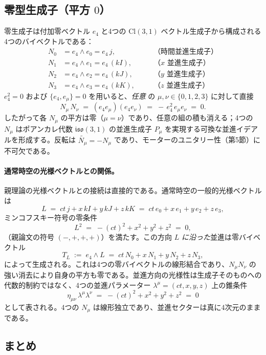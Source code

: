 \documentclass[11pt,a4paper]{article}
\begin{document}
\subsection{零型生成子（平方 $0$）}

零生成子は付加零ベクトル $e_{4}$ と4つの $\mathrm{Cl}(3,1)$ ベクトル生成子から構成される4つのバイベクトルである：
\begin{align*}
N_{0} &= e_{4}\wedge e_{0} = e_{4}\,j,         &\quad& \text{（時間並進生成子）}\\
N_{1} &= e_{4}\wedge e_{1} = e_{4}\,(kI),      &\quad& \text{（$x$ 並進生成子）}\\
N_{2} &= e_{4}\wedge e_{2} = e_{4}\,(kJ),      &\quad& \text{（$y$ 並進生成子）}\\
N_{3} &= e_{4}\wedge e_{3} = e_{4}\,(kK),      &\quad& \text{（$z$ 並進生成子）}
\end{align*}
$e_{4}^{2}=0$ および $\{e_{4},e_{\mu}\}=0$ を用いると、\emph{任意} の $\mu,\nu\in\{0,1,2,3\}$ に対して直接
\[
N_{\mu}\,N_{\nu} \;=\; (e_{4}e_{\mu})(e_{4}e_{\nu}) \;=\; -\,e_{4}^{2}\,e_{\mu}e_{\nu} \;=\; 0.
\]
したがって各 $N_{\mu}$ の平方は零（$\mu=\nu$）であり、任意の組の積も消える；4つの $N_{\mu}$ はポアンカレ代数 $\mathfrak{iso}(3,1)$ の並進生成子 $P_{\mu}$ を実現する可換な並進イデアルを形成する。反転は $\widetilde{N_{\mu}}=-N_{\mu}$ であり、モーターのユニタリー性（第5節）に不可欠である。

\paragraph{通常時空の光様ベクトルとの関係。}
親理論の光様ベクトルとの接続は直接的である。通常時空の一般的光様ベクトルは
\[
L \;=\; ct\,j + x\,kI + y\,kJ + z\,kK \;=\; ct\,e_{0} + x\,e_{1} + y\,e_{2} + z\,e_{3},
\]
ミンコフスキー符号の零条件
\[
L^{2} \;=\; -(ct)^{2} + x^{2} + y^{2} + z^{2} \;=\; 0,
\]
（親論文の符号 $(-,+,+,+)$）を満たす。この方向 $L$ \emph{に沿った}並進は零バイベクトル
\[
T_{L} \;:=\; e_{4}\wedge L \;=\; ct\,N_{0} + x\,N_{1} + y\,N_{2} + z\,N_{3},
\]
によって生成される。これは4つの零バイベクトルの線形結合であり、$N_{\mu}N_{\nu}$ の強い消去により自身の平方も零である。並進方向の光様性は生成子そのものへの代数的制約ではなく、4つの並進パラメーター $\lambda^{\mu}=(ct,x,y,z)$ 上の錐条件
\[
\eta_{\mu\nu}\,\lambda^{\mu}\lambda^{\nu} \;=\; -(ct)^{2}+x^{2}+y^{2}+z^{2} \;=\; 0
\]
として表される。4つの $N_{\mu}$ は線形独立であり、並進セクターは真に4次元のままである。

\subsection{まとめ}
\end{document}

